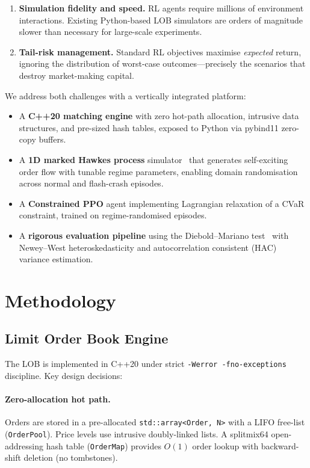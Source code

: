\documentclass[11pt,twocolumn]{article}
\begin{document}
\begin{enumerate}
  \item \textbf{Simulation fidelity and speed.}  RL agents require
  millions of environment interactions.  Existing Python-based LOB
  simulators are orders of magnitude slower than necessary for
  large-scale experiments.
  \item \textbf{Tail-risk management.}  Standard RL objectives
  maximise \emph{expected} return, ignoring the distribution of
  worst-case outcomes---precisely the scenarios that destroy
  market-making capital.
\end{enumerate}

We address both challenges with a vertically integrated platform:

\begin{itemize}
  \item A \textbf{C++20 matching engine} with zero hot-path allocation,
  intrusive data structures, and pre-sized hash tables, exposed to
  Python via pybind11 zero-copy buffers.
  \item A \textbf{1D marked Hawkes process} simulator~\citep{hawkes1971spectra}
  that generates self-exciting order flow with tunable regime
  parameters, enabling domain randomisation across normal and
  flash-crash episodes.
  \item A \textbf{Constrained PPO} agent implementing Lagrangian
  relaxation of a CVaR constraint, trained on regime-randomised
  episodes.
  \item A \textbf{rigorous evaluation pipeline} using the
  Diebold--Mariano test~\citep{diebold1995comparing} with Newey--West
  heteroskedasticity and autocorrelation consistent (HAC) variance
  estimation.
\end{itemize}

\section{Methodology}\label{sec:methods}

\subsection{Limit Order Book Engine}\label{sec:lob}

The LOB is implemented in C++20 under strict \texttt{-Werror
-fno-exceptions} discipline.  Key design decisions:

\paragraph{Zero-allocation hot path.}
Orders are stored in a pre-allocated \texttt{std::array<Order, N>} with
a LIFO free-list (\texttt{OrderPool}).  Price levels use intrusive
doubly-linked lists.  A splitmix64 open-addressing hash table
(\texttt{OrderMap}) provides $O(1)$ order lookup with backward-shift
deletion (no tombstones).
\end{document}
